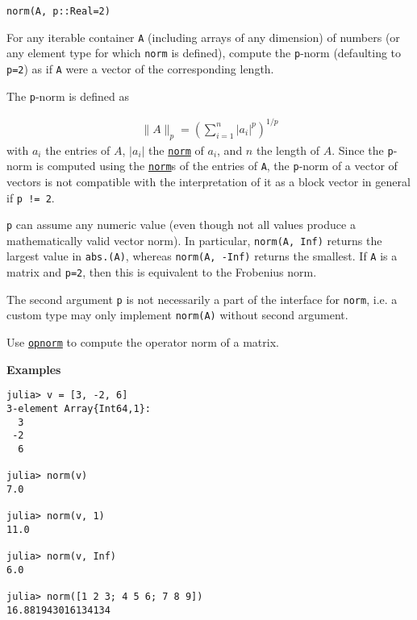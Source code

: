 \begin{adjustwidth}{2em}{0pt}


\begin{verbatim}
norm(A, p::Real=2)
\end{verbatim}

For any iterable container \texttt{A} (including arrays of any dimension) of numbers (or any element type for which \texttt{norm} is defined), compute the \texttt{p}-norm (defaulting to \texttt{p=2}) as if \texttt{A} were a vector of the corresponding length.

The \texttt{p}-norm is defined as

\begin{equation*}
\begin{split}\|A\|_p = \left( \sum_{i=1}^n | a_i | ^p \right)^{1/p}\end{split}\end{equation*}
with \(a_i\) the entries of \(A\), \(| a_i |\) the \hyperlink{898926013064269707}{\texttt{norm}} of \(a_i\), and \(n\) the length of \(A\). Since the \texttt{p}-norm is computed using the \hyperlink{898926013064269707}{\texttt{norm}}s of the entries of \texttt{A}, the \texttt{p}-norm of a vector of vectors is not compatible with the interpretation of it as a block vector in general if \texttt{p != 2}.

\texttt{p} can assume any numeric value (even though not all values produce a mathematically valid vector norm). In particular, \texttt{norm(A, Inf)} returns the largest value in \texttt{abs.(A)}, whereas \texttt{norm(A, -Inf)} returns the smallest. If \texttt{A} is a matrix and \texttt{p=2}, then this is equivalent to the Frobenius norm.

The second argument \texttt{p} is not necessarily a part of the interface for \texttt{norm}, i.e. a custom type may only implement \texttt{norm(A)} without second argument.

Use \hyperlink{4740175223212326101}{\texttt{opnorm}} to compute the operator norm of a matrix.

\textbf{Examples}


\begin{verbatim}
julia> v = [3, -2, 6]
3-element Array{Int64,1}:
  3
 -2
  6

julia> norm(v)
7.0

julia> norm(v, 1)
11.0

julia> norm(v, Inf)
6.0

julia> norm([1 2 3; 4 5 6; 7 8 9])
16.881943016134134


\end{verbatim}
\end{adjustwidth}
